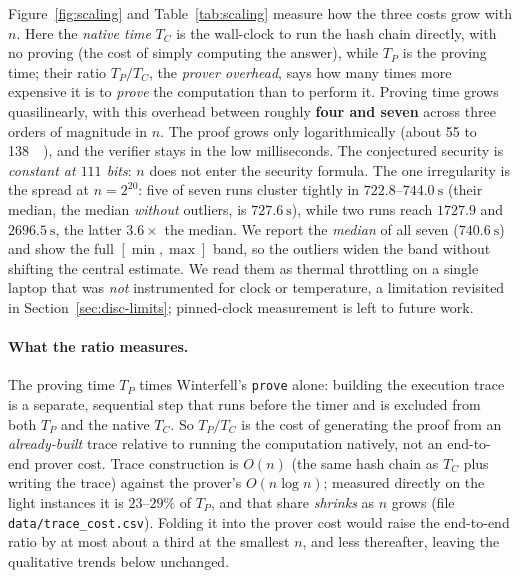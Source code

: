 \documentclass[11pt]{article}
\begin{document}
Figure~\ref{fig:scaling} and Table~\ref{tab:scaling} measure how the three costs grow with $n$. Here the
\emph{native time} $T_C$ is the wall-clock to run the hash chain directly, with no proving (the cost
of simply computing the answer), while $T_P$ is the proving time; their ratio $T_P/T_C$, the
\emph{prover overhead}, says how many times more expensive it is to \emph{prove} the computation than to
perform it. Proving time grows quasilinearly, with this overhead between roughly \textbf{four and seven}
across three orders of magnitude in $n$. The proof grows only logarithmically
(about \SI{55}{} to \SI{138}{\kibi\byte}), and the verifier stays in the low milliseconds. The
conjectured security is \emph{constant at $111$ bits}: $n$ does not enter the security formula. The one
irregularity is the spread at $n=2^{20}$: five of seven runs cluster tightly in
$722.8$--$\SI{744.0}{\second}$ (their median, the median \emph{without} outliers, is
$\SI{727.6}{\second}$), while two runs reach $1727.9$ and $\SI{2696.5}{\second}$, the latter $3.6\times$
the median. We report the \emph{median} of all seven ($\SI{740.6}{\second}$) and show the full
$[\min,\max]$ band, so the outliers widen the band without shifting the central estimate. We read them as
thermal throttling on a single laptop that was \emph{not} instrumented for clock or temperature, a
limitation revisited in Section~\ref{sec:disc-limits}; pinned-clock measurement is left to future work.

\paragraph{What the ratio measures.} The proving time $T_P$ times Winterfell's \texttt{prove} alone:
building the execution trace is a separate, sequential step that runs before the timer and is excluded
from both $T_P$ and the native $T_C$. So $T_P/T_C$ is the cost of generating the proof from an
\emph{already-built} trace relative to running the computation natively, not an end-to-end prover cost.
Trace construction is $O(n)$ (the same hash chain as $T_C$ plus writing the trace) against the
prover's $O(n\log n)$; measured directly on the light instances it is $23$--$29\%$ of $T_P$, and that
share \emph{shrinks} as $n$ grows (file \texttt{data/trace\_cost.csv}). Folding it into the prover cost
would raise the end-to-end ratio by at most about a third at the smallest $n$, and less thereafter,
leaving the qualitative trends below unchanged.
\end{document}
